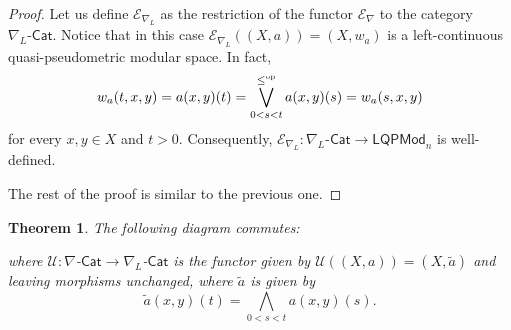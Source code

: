 \documentclass[11pt,a4paper]{amsart}
\newtheorem{theorem}{Theorem}[section]
\theoremstyle{definition}
\begin{document}
	\begin{proof}
		Let us define $\mathscr{E}_{\nabla_L}$ as the restriction of the functor $\mathscr{E}_{\nabla}$ to the category $\nabla_L\text{-}\mathsf{Cat}.$ Notice that in this case $\mathscr{E}_{\nabla_L}((X,a))=(X,w_a)$ is a left-continuous quasi-pseudometric modular space. In fact, $$w_a(t,x,y)=a(x,y)(t)=\bigvee^{\leq^\text{\normalfont op}}_{0<s<t} a(x,y)(s)=w_a(s,x,y)$$ for every $x,y\in X$ and $t>0.$ Consequently, $\mathscr{E}_{\nabla_L}:\nabla_L\text{-}\mathsf{Cat}\to \mathsf{LQPMod}_n$ is well-defined.
		
		The rest of the proof is similar to the previous one.
	\end{proof}
	
	\begin{theorem}
		
		The following diagram commutes:
		
		\begin{center}
		\end{center}
		where $\mathscr{U}:\nabla$-$\mathsf{Cat}\to\nabla_L$-$\mathsf{Cat}$ is the functor given by $\mathscr{U}((X,a))=(X,\widetilde{a})$ and leaving morphisms unchanged, where $\widetilde{a}$ is given by
		$$\widetilde{a}(x,y)(t)=\bigwedge_{0<s<t} a(x,y)(s).$$
		
	\end{theorem}
	
\end{document}

